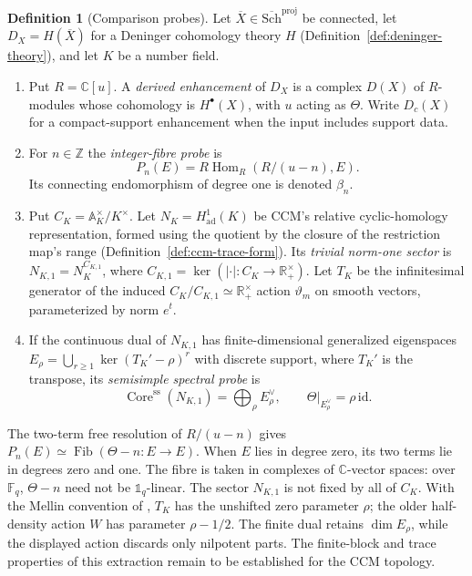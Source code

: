 \documentclass[11pt]{amsart}
\theoremstyle{plain}
\theoremstyle{definition}
\newtheorem{definition}[theorem]{Definition}
\theoremstyle{remark}
\numberwithin{equation}{section}
\newcommand{\C}{\mathbb{C}}
\newcommand{\R}{\mathbb{R}}
\newcommand{\Z}{\mathbb{Z}}
\newcommand{\F}{\mathbb{F}}
\newcommand{\Xbar}{\overline{X}}
\newcommand{\Schbar}{\overline{\mathrm{Sch}}}
\begin{document}
\begin{definition}[Comparison probes]\label{def:comparison-probes}
Let $\Xbar\in\Schbar^{\mathrm{proj}}$ be connected, let $D_X=H(\Xbar)$
for a Deninger cohomology theory $H$
(Definition~\ref{def:deninger-theory}), and let $K$ be a number field.
\begin{enumerate}[label=(\alph*)]
\item Put $R=\C[u]$.  A \emph{derived enhancement} of $D_X$ is a
  complex $D(X)$ of $R$-modules whose cohomology is $H^\bullet(X)$,
  with $u$ acting as $\Theta$.  Write $D_c(X)$ for a compact-support
  enhancement when the input includes support data.
\item For $n\in\Z$ the \emph{integer-fibre probe} is
  \[
  P_n(E)=R\operatorname{Hom}_{R}(R/(u-n),E).
  \]
  Its connecting endomorphism of degree one is denoted $\beta_n$.
\item Put $C_K=\mathbb A_K^\times/K^\times$.
  Let $N_K=H^1_{\mathrm{ad}}(K)$ be CCM's relative cyclic-homology
  representation, formed using the quotient by the closure of the
  restriction map's range (Definition~\ref{def:ccm-trace-form}).
  Its \emph{trivial norm-one sector} is
  $N_{K,1}=N_K^{C_{K,1}}$, where
  $C_{K,1}=\ker(|\cdot|:C_K\to\R_+^\times)$.
  Let $T_K$ be the infinitesimal generator of the induced
  $C_K/C_{K,1}\simeq\R_+^\times$ action $\vartheta_m$ on smooth
  vectors, parameterized by norm $e^t$.
\item If the continuous dual of $N_{K,1}$ has finite-dimensional
  generalized eigenspaces
  $E_\rho=\bigcup_{r\ge1}\ker(T_K'-\rho)^r$ with discrete support,
  where $T_K'$ is the transpose, its \emph{semisimple spectral probe}
  is
  \[
  \operatorname{Core}^{\mathrm{ss}}(N_{K,1})
  =\bigoplus_\rho E_\rho^\vee,
  \qquad \Theta|_{E_\rho^\vee}=\rho\,\mathrm{id}.
  \]
\end{enumerate}
\end{definition}

The two-term free resolution of $R/(u-n)$ gives
$P_n(E)\simeq\operatorname{Fib}(\Theta-n:E\to E)$.
When $E$ lies in degree zero, its two terms lie in degrees zero and
one.  The fibre is taken in complexes of $\C$-vector spaces: over
$\F_q$, $\Theta-n$ need not be $\mathbb 1_q$-linear.
The sector $N_{K,1}$ is not fixed by all of $C_K$.
With the Mellin convention of
\cite[Theorem~4.16 and (4.41)]{ConnesConsaniMarcolli2009Weil},
$T_K$ has the unshifted zero parameter $\rho$; the older
half-density action $W$ has parameter $\rho-1/2$.
The finite dual retains $\dim E_\rho$, while the displayed action
discards only nilpotent parts.  The finite-block and trace
properties of this extraction remain to be established for the
CCM topology.
\end{document}
